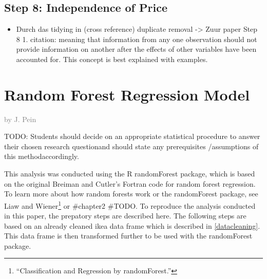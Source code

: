 \documentclass[a4paper, nobind]{templates/ociamthesis}
\providecommand{\tightlist}{%
  \setlength{\itemsep}{0pt}\setlength{\parskip}{0pt}}
\begin{document}
\hypertarget{step-8-independence-of-price}{%
\subsection{Step 8: Independence of Price}\label{step-8-independence-of-price}}

\begin{itemize}
\tightlist
\item
  Durch das tidying in (cross reference) duplicate removal -\textgreater{} Zuur paper Step 8 1. citation: meaning that information from any one observation should not provide information on another after the effects of other variables have been accounted for. This concept is best explained with examples.
\end{itemize}

\hypertarget{rf}{%
\section{Random Forest Regression Model}\label{rf}}

\textcolor{gray}{by J. Pein}

TODO: Students should decide on an appropriate statistical procedure to answer their chosen research questionand should state any prerequisites /assumptions of this methodaccordingly.

This analysis was conducted using the R randomForest package, which is based on the original Breiman and Cutler's Fortran code for random forest regression. To learn more about how random forests work or the randomForest package, see Liaw and Wiener\footnote{``Classification and Regression by randomForest.''} or \#chapter2 \#TODO. To reproduce the analysis conducted in this paper, the prepatory steps are described here. The following steps are based on an already cleaned ikea data frame which is described in \ref{datacleaning}. This data frame is then transformed further to be used with the randomForest package.
\end{document}
